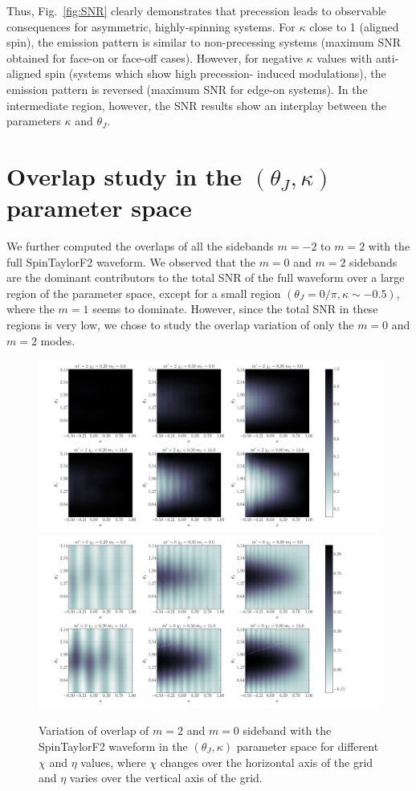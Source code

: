 Thus, Fig.~\ref{fig:SNR} clearly demonstrates that precession leads to
observable consequences for asymmetric, highly-spinning systems. For $\kappa$
close to 1 (aligned spin), the emission pattern is similar to non-precessing
systems (maximum SNR obtained for face-on or face-off cases). However, for
negative $\kappa$ values with anti-aligned spin (systems which show high
precession- induced modulations), the emission pattern is reversed (maximum
SNR for edge-on systems). In the intermediate region, however, the SNR results show an
interplay between the parameters $\kappa$ and $\theta_J$.

\section{Overlap study in the $(\theta_J, \kappa)$ parameter space}
We further computed the overlaps of all the sidebands $m=-2$ to $m=2$ with the
full SpinTaylorF2 waveform. We observed that the $m=0$ and  $m=2$ sidebands
are the dominant contributors to the total SNR of the full waveform over a
large region of the parameter space, except for a small region
$(\theta_J=0/\pi, \kappa \sim -0.5)$, where the $m=1$ seems to dominate.
However, since the total SNR in these regions is very low, we chose to study
the overlap variation of only the $m=0$ and  $m=2$ modes.

\label{fig:P2}  
\begin{figure}[!htp]
\includegraphics[width=\textwidth]{./images/OVLP_0F_P2.pdf}
\includegraphics[width=\textwidth]{./images/OVLP_0F_P0.pdf} \caption{Variation
of overlap of $m=2$ and $m=0$ sideband with the SpinTaylorF2
waveform in the $(\theta_J, \kappa)$ parameter space for  different $\chi$ and
$\eta$ values, where $\chi$ changes over the horizontal axis of the grid and
$\eta$ varies over the vertical axis of the grid.}  
\centering  
\end{figure}

